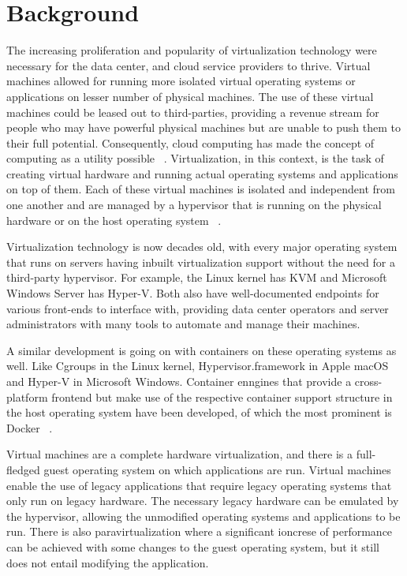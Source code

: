 \documentclass[10pt,twocolumn]{article}
\begin{document}
\section{Background}

The increasing proliferation and popularity of virtualization technology were necessary for the data center, and cloud service providers to thrive.
Virtual machines allowed for running more isolated virtual operating systems or applications on lesser number of physical machines.
The use of these virtual machines could be leased out to third-parties, providing a revenue stream for people who may have powerful physical machines but are unable to push them to their full potential.
Consequently, cloud computing has made the concept of computing as a utility possible ~\cite{berkeley_cloud}.
Virtualization, in this context, is the task of creating virtual hardware and running actual operating systems and applications on top of them.
Each of these virtual machines is isolated and independent from one another and are managed by a hypervisor that is running on the physical hardware or on the host operating system ~\cite{xen}.

Virtualization technology is now decades old, with every major operating system that runs on servers having inbuilt virtualization support without the need for a third-party hypervisor.
For example, the Linux kernel has KVM and Microsoft Windows Server has Hyper-V.
Both also have well-documented endpoints for various front-ends to interface with, providing data center operators and server administrators with many tools to automate and manage their machines.

A similar development is going on with containers on these operating systems as well. Like Cgroups in the Linux kernel, Hypervisor.framework in Apple macOS and Hyper-V in Microsoft Windows.
Container enngines that provide a cross-platform frontend but make use of the respective container support structure in the host operating system have been developed, of which the most prominent is Docker ~\cite{intro_docker}.

Virtual machines are a complete hardware virtualization, and there is a full-fledged guest operating system on which applications are run. Virtual machines enable the use of legacy applications that require legacy operating systems that only run on legacy hardware.
The necessary legacy hardware can be emulated by the hypervisor, allowing the unmodified operating systems and applications to be run.
There is also paravirtualization where a significant ioncrese of performance can be achieved with some changes to the guest operating system, but it still does not entail modifying the application.
\end{document}
